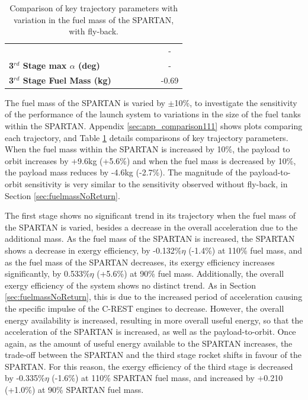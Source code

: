 \begin{table}[ht]
\begin{tabular}{l c c c c c c}
	& \thirdqOverFivemFuelNinety
	& \thirdqOverFivemFuelNinetyFive
	& \thirdqOverFivemFuelStandard
	& \thirdqOverFivemFuelOneHundredFive
	& \thirdqOverFivemFuelOneHundredTen
	& -
	\\
	\textbf{3$^{rd}$ Stage max $\alpha$ (deg)}
	& \thirdmaxAoAmFuelNinety
	& \thirdmaxAoAmFuelNinetyFive
	& \thirdmaxAoAmFuelStandard
	& \thirdmaxAoAmFuelOneHundredFive
	& \thirdmaxAoAmFuelOneHundredTen
	& -
	\\
	\textbf{3$^{rd}$ Stage Fuel Mass (kg)}
	& \thirdmFuelmFuelNinety
	& \thirdmFuelmFuelNinetyFive
	& \thirdmFuelmFuelStandard
	& \thirdmFuelmFuelOneHundredFive
	& \thirdmFuelmFuelOneHundredTen
	&-0.69
	\\
	\hline 
\end{tabular} 
\caption{Comparison of key trajectory parameters with variation in the fuel mass of the SPARTAN, with fly-back.}
\label{tab:comparison111}
\end{table}
	
The fuel mass of the SPARTAN is varied by $\pm$10\%, to investigate the sensitivity of the performance of the launch system to variations in the size of the fuel tanks within the SPARTAN. 
Appendix \ref{sec:app_comparison111} shows plots comparing each trajectory, and Table \ref{tab:comparison111} details comparisons of key trajectory parameters. 
When the fuel mass within the SPARTAN is increased by 10\%, the payload to orbit increases by +9.6kg (+5.6\%) and when the fuel mass is decreased by 10\%, the payload mass reduces by -4.6kg (-2.7\%). The magnitude of the payload-to-orbit sensitivity is very similar to the sensitivity observed without fly-back, in Section \ref{sec:fuelmassNoReturn}. 

The first stage shows no significant trend in its trajectory when the fuel mass of the SPARTAN is varied, besides a decrease in the overall acceleration due to the additional mass. 
As the fuel mass of the SPARTAN is increased, the SPARTAN shows a decrease in exergy efficiency, by -0.132\%$\eta$ (-1.4\%) at 110\% fuel mass, and as the fuel mass of the SPARTAN decreases, its exergy efficiency increases significantly, by 0.533\%$\eta$ (+5.6\%) at 90\% fuel mass. Additionally, the overall exergy efficiency of the system shows no distinct trend. 
As in Section \ref{sec:fuelmassNoReturn}, this is due to the increased period of acceleration causing the specific impulse of the C-REST engines to decrease. However, the overall energy availability is increased, resulting in more overall useful energy, so that the acceleration of the SPARTAN is increased, as well as the payload-to-orbit.
Once again, as the amount of useful energy available to the SPARTAN increases, the trade-off between the SPARTAN and the third stage rocket shifts in favour of the SPARTAN. For this reason, the exergy efficiency of the third stage is decreased by -0.335\%$\eta$ (-1.6\%) at 110\% SPARTAN fuel mass, and increased by +0.210 (+1.0\%) at 90\% SPARTAN fuel mass. 



